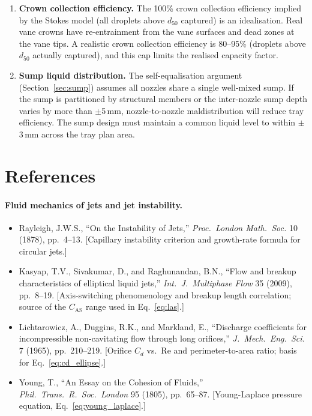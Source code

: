 \documentclass[11pt,letterpaper]{article}
\newcommand{\dcut}{d_{50}}
\begin{document}
\begin{enumerate}[nosep]
  \item \textbf{Crown collection efficiency.}
    The 100\% crown collection efficiency implied by the Stokes model
    (all droplets above $\dcut$ captured) is an idealisation.  Real vane
    crowns have re-entrainment from the vane surfaces and dead zones at the
    vane tips.  A realistic crown collection efficiency is 80--95\%
    (droplets above $\dcut$ actually captured), and this cap limits the
    realised capacity factor.

  \item \textbf{Sump liquid distribution.}
    The self-equalisation argument (Section~\ref{sec:sump}) assumes all
    nozzles share a single well-mixed sump.  If the sump is partitioned
    by structural members or the inter-nozzle sump depth varies by more than
    $\pm$5\,mm, nozzle-to-nozzle maldistribution will reduce tray
    efficiency.  The sump design must maintain a common liquid level to
    within $\pm$3\,mm across the tray plan area.
\end{enumerate}

\section{References}
\label{sec:refs}

\paragraph{Fluid mechanics of jets and jet instability.}
\begin{itemize}[nosep]
  \item Rayleigh, J.W.S., ``On the Instability of Jets,''
    \textit{Proc.\ London Math.\ Soc.} 10 (1878), pp.\ 4--13.
    [Capillary instability criterion and growth-rate formula for circular jets.]

  \item Kasyap, T.V., Sivakumar, D., and Raghunandan, B.N.,
    ``Flow and breakup characteristics of elliptical liquid jets,''
    \textit{Int.\ J.\ Multiphase Flow} 35 (2009), pp.\ 8--19.
    [Axis-switching phenomenology and breakup length correlation;
    source of the $C_{\mathrm{AS}}$ range used in Eq.~\ref{eq:las}.]

  \item Lichtarowicz, A., Duggins, R.K., and Markland, E.,
    ``Discharge coefficients for incompressible non-cavitating flow
    through long orifices,''
    \textit{J.\ Mech.\ Eng.\ Sci.} 7 (1965), pp.\ 210--219.
    [Orifice $C_d$ vs.\ Re and perimeter-to-area ratio;
    basis for Eq.~\ref{eq:cd_ellipse}.]

  \item Young, T., ``An Essay on the Cohesion of Fluids,''
    \textit{Phil.\ Trans.\ R.\ Soc.\ London} 95 (1805), pp.\ 65--87.
    [Young-Laplace pressure equation, Eq.~\ref{eq:young_laplace}.]
\end{itemize}
\end{document}
